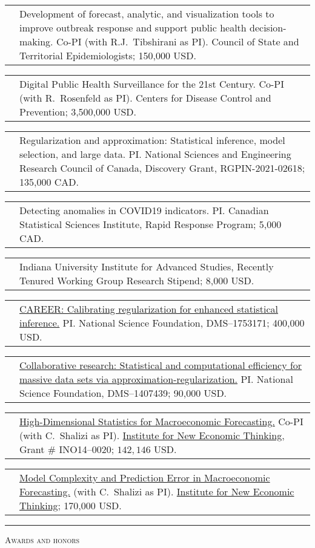 \documentclass[11pt,letterpaper]{minimal/moderncv}
\makeatletter
\renewcommand{\section}[1]{  \par\addvspace{15pt}%
  \parbox[t]{\hintscolumnwidth}{\strut\raggedleft\raisebox{4pt}%
  {\rule{\hintscolumnwidth}{2pt}}}%
  \hspace{\separatorcolumnwidth}%
  \textsc{\Large #1}\par\nobreak\addvspace{6pt}%
}
\renewcommand*{\cvitem}[2]{%
  \begin{tabular}{@{}p{\hintscolumnwidth}@{\hspace{\separatorcolumnwidth}}%
    p{\maincolumnwidth}@{}}%
    \raggedleft {#1} &  {#2}%
  \end{tabular}%
}
\makeatother
\begin{document}
\cvitem{2023--2024}{Development of forecast, analytic, and visualization tools
to improve outbreak response and support public health decision-making. Co-PI
(with R.J.\ Tibshirani as PI). Council of State and Territorial Epidemiologists;
150,000 USD.}

\cvitem{2023}{Digital Public Health Surveillance for the 21st Century. Co-PI
(with R.\ Rosenfeld as PI). Centers for Disease Control and Prevention;
3,500,000 USD.}


\cvitem{2021--2025}{Regularization and approximation: Statistical inference,
  model selection, and large data. PI. National Sciences and Engineering
  Research Council of Canada, Discovery Grant, RGPIN-2021-02618; 135,000 CAD.}

\cvitem{2020--2021}{Detecting anomalies in COVID19
  indicators. PI. Canadian Statistical Sciences Institute, Rapid
  Response Program; 5,000 CAD.}

\cvitem{2019--2020}{Indiana University Institute for Advanced Studies, Recently
  Tenured Working Group Research Stipend; 8,000 USD.}

\cvitem{2018--2023}{\href{http://www.nsf.gov/awardsearch/showAward?AWD_ID=1753171}{CAREER:
  Calibrating regularization for enhanced statistical inference.}
PI. National Science Foundation, DMS--1753171; 400,000 USD.}


\cvitem{2014--2018}{\href{http://www.nsf.gov/awardsearch/showAward?AWD_ID=1407439}{Collaborative
  research: Statistical and computational efficiency for 
massive data sets via approximation-regularization.} PI. National
Science Foundation, DMS--1407439; 90,000 USD.}


\cvitem{2014--2016}{\href{https://www.ineteconomics.org/research/grants/high-dimensional-statistics-for-macroeconomic-forecasting}
{High-Dimensional Statistics for Macroeconomic Forecasting.} Co-PI (with C.\ Shalizi as PI). \href{http://ineteconomics.org}{Institute for New Economic Thinking}, Grant \# INO14--0020; $142,146$ USD.}


\cvitem{2011--2013}{\href{https://www.ineteconomics.org/research/grants/model-complexity-and-prediction-error-in-macroeconomic-forecasting} 
{Model Complexity and Prediction Error in Macroeconomic Forecasting.}
(with C.\ Shalizi as PI).
\href{http://ineteconomics.org}{Institute for New Economic
  Thinking}; 170,000 USD.}


  
\section{Awards and honors}
\end{document}
